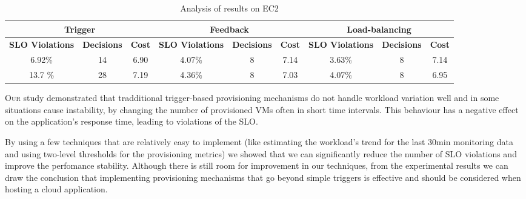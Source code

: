 
\begin{table}[tbp]
  {\scriptsize 
\begin{center}
    \begin{tabular}{  | c | c | c | c | c | c | c | c | c |}
    \hline
    \multicolumn{3}{|c|}{ \textbf{Trigger}  } & \multicolumn{3}{|c|}{ \textbf{Feedback} }&  \multicolumn{3}{c|}{ \textbf{Load-balancing}  }   \\ \hline 
 \textbf{SLO Violations}& \textbf{Decisions} & \textbf{Cost} & \textbf{SLO Violations} & \textbf{Decisions} & \textbf{Cost} & \textbf{SLO Violations} & \textbf{Decisions} & \textbf{Cost} \\ \hline
  6.92\% & 14 & 6.90 &  4.07\%  & 8 & 7.14 &  3.63\% & 8 & 7.14  \\ \hline
  13.7 \% & 28 & 7.19 &  4.36\%  & 8 & 7.03 &  4.07\% & 8 & 6.95  \\ \hline
 \end{tabular}
\end{center}
\vspace{-5mm}
\caption{Analysis of results on EC2}
\label{summaryEC2}
}
\end{table}




\lettrine{O}{ur} study demonstrated that tradditional trigger-based
provisioning mechanisms do not handle workload variation well and
in some situations cause instability, by changing the number of
provisioned VMs often in short time intervals. This behaviour has a 
negative effect on the application's response time, leading to violations
of the SLO.

By using a few techniques that are relatively easy to implement (like
estimating the workload's trend for the last 30min monitoring data and using
two-level thresholds for the provisioning metrics) we showed that
we can significantly reduce the number of SLO violations and
improve the perfomance stability. Although there is still room for improvement
in our techniques, from the experimental results we can draw the
conclusion that implementing provisioning mechanisms that go
beyond simple triggers is effective and should be considered
when hosting a cloud application.

